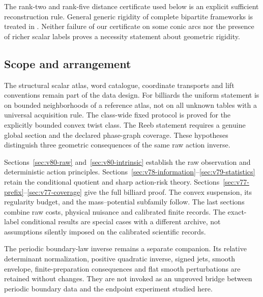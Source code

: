 The rank-two and rank-five distance certificate used below is an
explicit sufficient reconstruction rule.  General generic rigidity of
complete bipartite frameworks is treated in
\cite{V77ConnellyGortlerTheran}.  Neither failure of our certificate on
some conic arcs nor the presence of richer scalar labels proves a
necessity statement about geometric rigidity.

\subsection{Scope and arrangement}

The structural scalar atlas, word catalogue, coordinate transports and
lift conventions remain part of the data design.  For billiards the
uniform statement is on bounded neighborhoods of a reference atlas,
not on all unknown tables with a universal acquisition rule.  The
class-wide fixed protocol is proved for the explicitly bounded convex
twist class.  The Reeb statement requires a genuine global section and
the declared phase-graph coverage.  These hypotheses distinguish three
geometric consequences of the same raw action inverse.

Sections~\ref{sec:v80-raw} and~\ref{sec:v80-intrinsic} establish the
raw observation and deterministic action principles.
Sections~\ref{sec:v78-information}--\ref{sec:v79-statistics} retain
the conditional quotient and sharp action-risk theory.
Sections~\ref{sec:v77-prefix}--\ref{sec:v77-coverage} give the full
billiard proof.  The convex suspension, its regularity budget, and the
mass--potential subfamily follow.  The last sections combine raw costs,
physical nuisance and calibrated finite records.  The exact-label
conditional results are special cases with a different archive, not
assumptions silently imposed on the calibrated scientific records.

The periodic boundary-law inverse remains a separate companion.  Its
relative determinant normalization, positive quadratic inverse, signed
jets, smooth envelope, finite-preparation consequences and flat smooth
perturbations are retained without changes.  They are not invoked as
an unproved bridge between periodic boundary data and the endpoint
experiment studied here.

